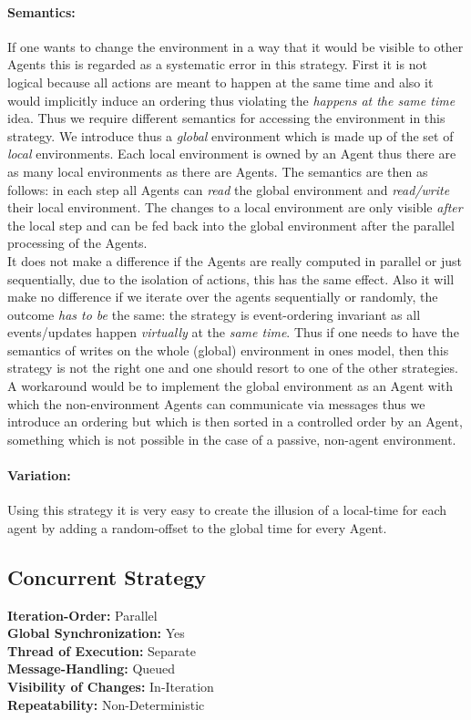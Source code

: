 \paragraph{Semantics:} If one wants to change the environment in a way that it would be visible to other Agents this is regarded as a systematic error in this strategy. First it is not logical because all actions are meant to happen at the same time and also it would implicitly induce an ordering thus violating the \textit{happens at the same time} idea. Thus we require different semantics for accessing the environment in this strategy. We introduce thus a \textit{global} environment which is made up of the set of \textit{local} environments. Each local environment is owned by an Agent thus there are as many local environments as there are Agents. The semantics are then as follows: in each step all Agents can \textit{read} the global environment and \textit{read/write} their local environment. The changes to a local environment are only visible \textit{after} the local step and can be fed back into the global environment after the parallel processing of the Agents. \\
It does not make a difference if the Agents are really computed in parallel or just sequentially, due to the isolation of actions, this has the same effect. Also it will make no difference if we iterate over the agents sequentially or randomly, the outcome \textit{has to be} the same: the strategy is event-ordering invariant as all events/updates happen \textit{virtually} at the \textit{same time}. Thus if one needs to have the semantics of writes on the whole (global) environment in ones model, then this strategy is not the right one and one should resort to one of the other strategies. A workaround would be to implement the global environment as an Agent with which the non-environment Agents can communicate via messages thus we introduce an ordering but which is then sorted in a controlled order by an Agent, something which is not possible in the case of a passive, non-agent environment.

\paragraph{Variation:} Using this strategy it is very easy to create the illusion of a local-time for each agent by adding a random-offset to the global time for every Agent.

\subsection{Concurrent Strategy}
\textbf{Iteration-Order:} Parallel \\
\textbf{Global Synchronization:} Yes \\
\textbf{Thread of Execution:} Separate \\
\textbf{Message-Handling:} Queued \\
\textbf{Visibility of Changes:}	In-Iteration \\
\textbf{Repeatability:}	Non-Deterministic 

